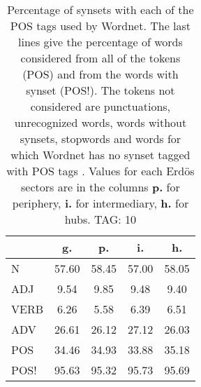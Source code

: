 \begin{table}[h!]
\begin{center}
\begin{tabular}{| l || c | c | c | c |}\hline
 & {\bf g.} & {\bf p.} & {\bf i.} & {\bf h.} \\\hline\hline
N & 57.60  & 58.45  & 57.00  & 58.05 \\\hline
ADJ & 9.54  & 9.85  & 9.48  & 9.40 \\\hline
VERB & 6.26  & 5.58  & 6.39  & 6.51 \\\hline
ADV & 26.61  & 26.12  & 27.12  & 26.03 \\\hline\hline
POS & 34.46  & 34.93  & 33.88  & 35.18 \\\hline
POS! & 95.63  & 95.32  & 95.73  & 95.69 \\\hline
\end{tabular}
\caption{Percentage of synsets with each of the POS tags used by Wordnet. The last lines give the percentage of words considered from all of the tokens (POS) and from the words with synset (POS!). The tokens not considered are punctuations, unrecognized words, words without synsets, stopwords and words for which Wordnet has no synset  tagged with POS tags . Values for each Erd\"os sectors are in the columns {{\bf p.}} for periphery, {{\bf i.}} for intermediary, {{\bf h.}} for hubs. TAG: 10}
\end{center}
\end{table}